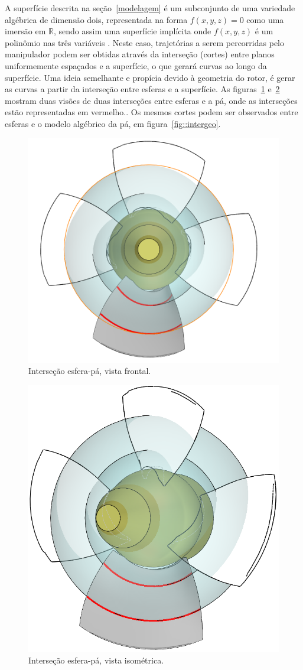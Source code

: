 A superfície descrita na seção~\ref{modelagem} é um subconjunto de uma
variedade algébrica de dimensão dois, representada na forma $f(x,y,z)=0$ como
uma imersão em $\mathbb{R}$, sendo assim uma superfície implícita onde
$f(x,y,z)$ é um polinômio nas três variáveis .
Neste caso, trajetórias a serem percorridas pelo manipulador podem ser obtidas através da interseção (cortes)
entre planos uniformemente espaçados e a superfície, o que gerará curvas ao
longo da superfície. Uma ideia semelhante e propícia devido à geometria do
rotor, é gerar as curvas a partir da interseção entre esferas e a superfície. As
figuras~\ref{fig::interfrontal} e~\ref{fig::interiso} mostram duas visões de
duas interseções entre esferas e a pá, onde as interseções estão representadas
em vermelho.. Os mesmos cortes podem ser observados entre esferas e o modelo
algébrico da pá, em figura~\ref{fig::intergeo}.


\begin{figure}[!ht]
	\centering
	\includegraphics[width=.7\columnwidth]{figs/planejamento/intersecao_frontal.PNG}
	\caption{Interseção esfera-pá, vista frontal.}
	\label{fig::interfrontal}
\end{figure}

\begin{figure}[!ht]
	\centering
	\includegraphics[width=.6\columnwidth]{figs/planejamento/intersecao_iso.PNG}
	\caption{Interseção esfera-pá, vista isométrica.}
	\label{fig::interiso}
\end{figure}

